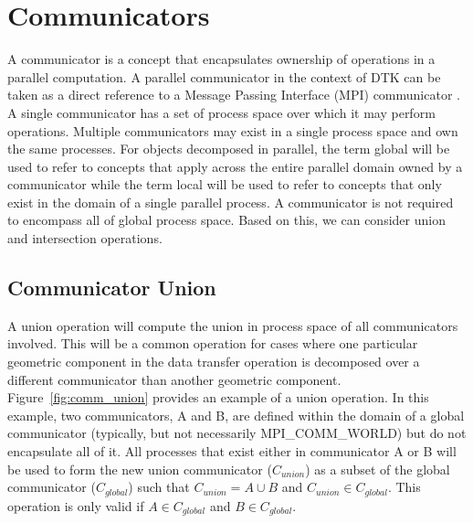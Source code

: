 \documentclass[letterpaper,12pt]{article}
\begin{document}
\clearpage

\section{Communicators}\label{sec:communicators}
A communicator is a concept that encapsulates ownership of operations
in a parallel computation. A parallel communicator in the context of
DTK can be taken as a direct reference to a Message Passing Interface
(MPI) communicator \cite{MPI_1994}. A single communicator has a set of
process space over which it may perform operations. Multiple
communicators may exist in a single process space and own the same
processes. For objects decomposed in parallel, the term global will be
used to refer to concepts that apply across the entire parallel domain
owned by a communicator while the term local will be used to refer to
concepts that only exist in the domain of a single parallel process. A
communicator is not required to encompass all of global process
space. Based on this, we can consider union and intersection
operations.

\subsection{Communicator Union}\label{subsec:comm_union}
A union operation will compute the union in process space of all
communicators involved. This will be a common operation for cases
where one particular geometric component in the data transfer
operation is decomposed over a different communicator than another
geometric component. Figure~\ref{fig:comm_union} provides an example
of a union operation. In this example, two communicators, A and B, are
defined within the domain of a global communicator (typically, but not
necessarily MPI\_COMM\_WORLD) but do not encapsulate all of it. All
processes that exist either in communicator A or B will be used to
form the new union communicator ($C_{union}$) as a subset of the
global communicator ($C_{global}$) such that $C_{union} = A \cup B$
and $C_{union} \in C_{global}$. This operation is only valid if $A \in
C_{global}$ and $B \in C_{global}$.
\end{document}
